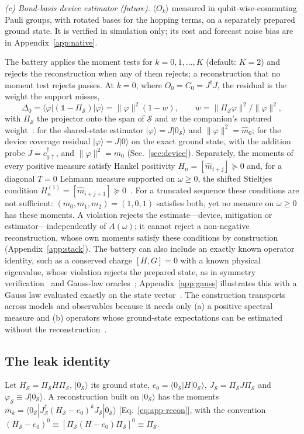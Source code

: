 \documentclass[submission, PhysCore]{SciPost}
\newcommand{\openone}{\mathds{1}}%
\begin{document}
\emph{(c) Bond-basis device estimator (future).} $\langle O_k\rangle$ measured in qubit-wise-commuting Pauli groups, with rotated bases for the hopping terms, on a separately prepared ground state. It is verified in simulation only; its cost and forecast noise bias are in Appendix~\ref{app:native}.

The battery applies the moment tests for $k = 0,1,\dots,K$ (default: $K=2$) and rejects the reconstruction when any of them rejects; a reconstruction that no moment test rejects passes. At $k=0$, where $O_0=C_0=J^\dagger J$, the residual is the weight the support misses,
\[
\Delta_0=\langle\varphi|(\openone-\Pi_\mathcal{S})|\varphi\rangle=\|\varphi\|^2(1-w),\qquad w=\|\Pi_\mathcal{S}\varphi\|^2/\|\varphi\|^2 ,
\]
with $\Pi_\mathcal S$ the projector onto the span of $\mathcal S$ and $w$ the companion's captured weight~\cite{SQDspec2608}: for the shared-state estimator $|\varphi\rangle=J|0_\mathcal{S}\rangle$ and $\|\varphi\|^2=\widehat m_0$; for the device coverage residual $|\varphi\rangle=J|0\rangle$ on the exact ground state, with the addition probe $J=c^{\dagger}_{0\uparrow}$, and $\|\varphi\|^2=m_0$ (Sec.~\ref{sec:device}). Separately, the moments of every positive measure satisfy Hankel positivity $H_n=[\widehat m_{i+j}]\succeq 0$ and, for a diagonal $T=0$ Lehmann measure supported on ${\omega\ge 0}$, the shifted Stieltjes condition $H_n^{(1)}=[\widehat m_{i+j+1}]\succeq 0$~\cite{ShohatTamarkin1943,Akhiezer1965,KreinNudelman1977}. For a truncated sequence these conditions are not sufficient: $(m_0,m_1,m_2)=(1,0,1)$ satisfies both, yet no measure on $\omega\ge0$ has these moments. A violation rejects the estimate---device, mitigation or estimator---independently of $A(\omega)$; it cannot reject a non-negative reconstruction, whose own moments satisfy these conditions by construction (Appendix~\ref{app:stack}). The battery can also include an exactly known operator identity, such as a conserved charge $[H,G]=0$ with a known physical eigenvalue, whose violation rejects the prepared state, as in symmetry verification~\cite{BonetMonroig2018,McArdleYuanBenjamin2019} and Gauss-law oracles~\cite{Stryker2019}; Appendix~\ref{app:gauss} illustrates this with a Gauss law evaluated exactly on the state vector~\cite{Gauss2020}. The construction transports across models and observables because it needs only (a) a positive spectral measure and (b) operators whose ground-state expectations can be estimated without the reconstruction~\cite{KPM2006,GM2010}.

\subsection{The leak identity}\label{sec:leak}
Let $H_\mathcal{S}=\Pi_\mathcal{S}H\Pi_\mathcal{S}$, $|0_\mathcal S\rangle$ its ground state, $e_0=\langle 0_\mathcal{S}|H|0_\mathcal{S}\rangle$, $J_\mathcal{S}=\Pi_\mathcal{S}J\Pi_\mathcal{S}$ and $\varphi_\mathcal S\equiv J|0_\mathcal S\rangle$. A reconstruction built on $|0_\mathcal{S}\rangle$ has the moments $\bar m_k={\langle 0_\mathcal{S}|J_\mathcal{S}^\dagger(H_\mathcal{S}-e_0)^kJ_\mathcal{S}|0_\mathcal{S}\rangle}$ [Eq.~\eqref{eq:app-recon}], with the convention $(H_\mathcal S-e_0)^0\equiv[\Pi_\mathcal S(H-e_0)\Pi_\mathcal S]^0\equiv\Pi_\mathcal S$.
\end{document}
